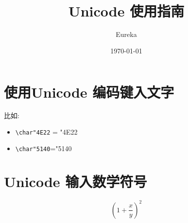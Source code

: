 \documentclass[12pt]{article}
\title{Unicode 使用指南}
\author{Eureka}
\date{\today}
\begin{document}
\maketitle
\tableofcontents
\clearpage


\section{使用Unicode 编码键入文字}
比如: 
\begin{itemize}
    \item \verb|\char"4E22| = \char"4E22
    \item \verb|\char"5140|=\char"5140
\end{itemize}



\section{Unicode 输入数学符号}


$$
(1 + \frac xy)^2
$$
\end{document}
